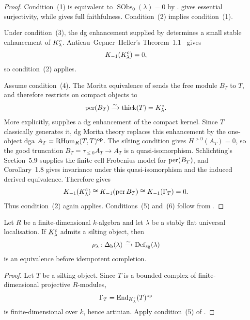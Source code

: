 \begin{proof}
Condition~\textup{(1)} is equivalent to \(\operatorname{SObs}_0(\lambda)=0\) by .   gives essential surjectivity, while  gives full faithfulness.  Condition~\textup{(2)} implies condition~\textup{(1)}.

Under condition~\textup{(3)}, the dg enhancement supplied by  determines a small stable enhancement of \(K^c_\lambda\).  Antieau--Gepner--Heller's Theorem~1.1~\cite{AGH19} gives
\[
 K_{-1}(K^c_\lambda)=0,
\]
so condition~\textup{(2)} applies.

Assume condition~\textup{(4)}.  The Morita equivalence of  sends the free module \(B_T\) to \(T\), and therefore restricts on compact objects to
\[
 \operatorname{per}(B_T)\xrightarrow{\sim}\operatorname{thick}(T)=K^c_\lambda.
\]
More explicitly,  supplies a dg enhancement of the compact kernel.  Since \(T\) classically generates it, dg Morita theory replaces this enhancement by the one-object dga \(A_T=\operatorname{RHom}_R(T,T)^{\mathrm{op}}\).  The silting condition gives \(H^{>0}(A_T)=0\), so the good truncation \(B_T=\tau_{\le0}A_T\to A_T\) is a quasi-isomorphism.  Schlichting's Section~5.9 supplies the finite-cell Frobenius model for \(\operatorname{per}(B_T)\), and Corollary~1.8 gives invariance under this quasi-isomorphism and the induced derived equivalence.  Therefore  gives
\[
 K_{-1}(K^c_\lambda)
 \cong K_{-1}(\operatorname{per} B_T)
 \cong K_{-1}(\Gamma_T)=0.
\]
Thus condition~\textup{(2)} again applies.  Conditions~\textup{(5)} and~\textup{(6)} follow from .
\end{proof}

\begin{corollary}\label{cor:finite-dimensional-precompletion}
Let \(R\) be a finite-dimensional \(k\)-algebra and let \(\lambda\) be a stably flat universal localisation.  If \(K^c_\lambda\) admits a silting object, then
\[
 \rho_\lambda:\Delta_{\mathrm b}(\lambda)\xrightarrow{\sim}\operatorname{Def}_{\mathrm{sg}}(\lambda)
\]
is an equivalence before idempotent completion.
\end{corollary}

\begin{proof}
Let \(T\) be a silting object.  Since \(T\) is a bounded complex of finite-dimensional projective \(R\)-modules,
\[
 \Gamma_T=\operatorname{End}_{K^c_\lambda}(T)^{\mathrm{op}}
\]
is finite-dimensional over \(k\), hence artinian.  Apply condition~\textup{(5)} of .
\end{proof}

